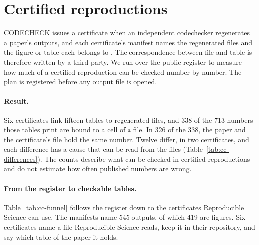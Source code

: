 
\section{Certified reproductions}
\label{sec:codecheck}

CODECHECK issues a certificate when an independent codechecker regenerates a paper's outputs, and
each certificate's manifest names the regenerated files and the figure or table each belongs to
\citep{nust2021codecheck}. The correspondence between file and table
is therefore written by a third party. We run \tVerifyCmd{} over the public register to measure
how much of a certified reproduction can be checked number by number. The plan is registered
before any output file is opened.

\paragraph{Result.} Six certificates link fifteen tables to regenerated files, and 338 of the
713 numbers those tables print are bound to a cell of a file. In 326 of the 338, the paper and the
certificate's file hold the same number. Twelve differ, in two certificates, and each difference
has a cause that can be read from the files (Table~\ref{tab:cc-differences}). The counts describe
what can be checked in certified reproductions and do not estimate how often published numbers
are wrong.

\paragraph{From the register to checkable tables.} Table~\ref{tab:cc-funnel} follows the
register down to the certificates Reproducible Science can use. The manifests name 545 outputs, of which
419 are figures. Six certificates name a file Reproducible Science reads, keep it in their repository,
and say which table of the paper it holds.

